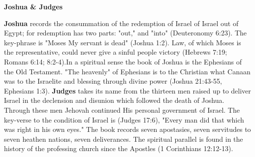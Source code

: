 \documentclass[11pt,landscape,twocolumn,letterpaper]{article}
\begin{document}
\newpage
\begin{center}
\textbf{Joshua \& Judges}
\end{center}
\textbf{Joshua} records the consummation of the redemption of Israel of Israel out of Egypt; for redemption has two parts: "out," and "into" (Deuteronomy 6:23). The key-phrase is "Moses My servant is dead" (Joshua 1:2). Law, of which Moses is the representative, could never give a sinful people victory (Hebrews 7:19; Romans 6:14; 8:2-4).In a spiritual sense the book of Joshua is the Ephesians of the Old Testament. "The heavenly" of Ephesians is to the Christian what Canaan was to the Israelite and blessing through divine power (Joshua 21:43-55, Ephesians 1:3). \textbf{Judges} takes its name from the thirteen men raised up to deliver Israel in the declension and disunion which followed the death of Joshua. Through these men Jehovah continued His personal government of Israel. The key-verse to the condition of Israel is (Judges 17:6), "Every man did that which was right in his own eyes." The book records seven apostasies, seven servitudes to seven heathen nations, seven deliverances. The spiritual parallel is found in the history of the professing church since the Apostles (1 Corinthians 12:12-13).
\end{document}
